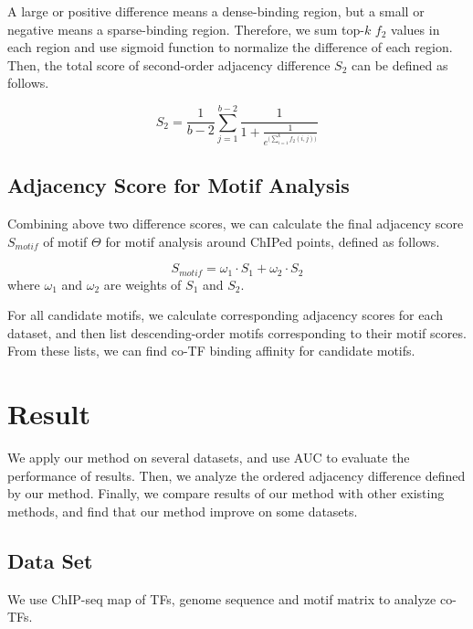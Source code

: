 \documentclass[journal,transmag]{IEEEtran}
\begin{document}
A large or positive difference means a dense-binding region, but a
small or negative means a sparse-binding region. Therefore, we sum
top-$k$ $f_{2}$ values in each region and use sigmoid function
\cite{mybibfile:sigmoid} to normalize the difference of each region.
Then, the total score of second-order adjacency difference $S_{2}$
can be defined as follows.

\begin{equation}
\label{score_v_equ} S_{2} =
\frac{1}{b-2}\sum\limits_{j=1}^{b-2}\frac{1}{1 +
\frac{1}{e^{\Big(\sum_{i=1}^{k}f_{2}(i, j)\Big)}}}
\end{equation}



\subsection{Adjacency Score for Motif Analysis}

Combining above two difference scores, we can calculate the final
adjacency score $S_{motif}$ of motif $\Theta$ for motif analysis
around ChIPed points, defined as follows.

\begin{equation}
\label{motif_score_equ} S_{motif} = \omega_{1} \cdot S_{1} +
\omega_{2} \cdot S_{2}
\end{equation}
where $\omega_{1}$ and $\omega_{2}$ are weights of $S_{1}$ and
$S_{2}$.

For all candidate motifs, we calculate corresponding adjacency
scores for each dataset, and then list descending-order motifs
corresponding to their motif scores. From these lists, we can find
co-TF binding affinity for candidate motifs.



\section{Result}


We apply our method on several datasets, and use AUC to evaluate the
performance of results. Then, we analyze the ordered adjacency
difference defined by our method. Finally, we compare results of our
method with other existing methods, and find that our method improve
on some datasets.


\subsection{Data Set}

We use ChIP-seq map of TFs, genome sequence and motif matrix to
analyze co-TFs.
\end{document}
